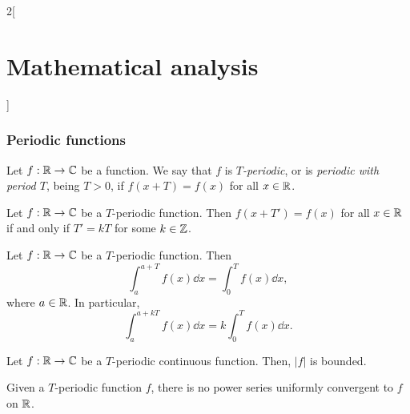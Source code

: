 \documentclass[../../../main.tex]{subfiles}
\begin{document}
\begin{multicols}{2}[\section{Mathematical analysis}]
\subsubsection*{Periodic functions}
\begin{definition}
Let $f:\mathbb{R} \rightarrow\mathbb{C} $ be a function. We say that $f$ is \textit{$T$-periodic}, or is \textit{periodic with period $T$}, being $T>0$, if $f(x+T)=f(x)$ for all $x\in\mathbb{R} $.
\end{definition}
\begin{lemma}
Let $f:\mathbb{R} \rightarrow\mathbb{C} $ be a $T$-periodic function. Then $f(x+T')=f(x)$ for all $x\in\mathbb{R} $ if and only if $T'=kT$ for some $k\in\mathbb{Z} $.
\end{lemma}
\begin{prop}
Let $f:\mathbb{R} \rightarrow\mathbb{C} $ be a $T$-periodic function. Then $$\int_a^{a+T}f(x)\dd x=\int_0^Tf(x)\dd x,$$ where $a\in\mathbb{R} $. In particular, $$\int_a^{a+kT}f(x)\dd x=k\int_0^Tf(x)\dd x.$$
\end{prop}
\begin{lemma}
Let $f:\mathbb{R} \rightarrow\mathbb{C} $ be a $T$-periodic continuous function. Then, $|f|$ is bounded.
\end{lemma}
\begin{prop}
Given a $T$-periodic function $f$, there is no power series uniformly convergent to $f$ on $\mathbb{R} $.
\end{prop}

\end{multicols}
\end{document}
